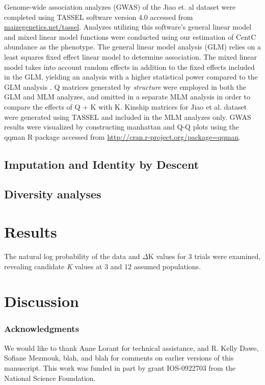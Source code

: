 \documentclass[12pt]{article}
\begin{document}

Genome-wide association analyzes (GWAS) of the Jiao et. al dataset \cite{Jiao2012} were completed using TASSEL \cite{Bradbury2007} software version 4.0 accessed from \url{maizegenetics.net/tassel}.  Analyzes utilizing this software's general linear model and mixed linear model functions were conducted using our estimation of CentC abundance as the phenotype.  The general linear model analysis (GLM) relies on a least squares fixed effect linear model to determine association.  The mixed linear model takes into account random effects in addition to the fixed effects included in the GLM, yielding an analysis with a higher statistical power compared to the GLM analysis \cite{Yu2006}.  Q matrices generated by \emph{structure} were employed in both the GLM and MLM analyzes, and omitted in a separate MLM analysis in order to compare the effects of Q + K with K.  Kinship matrices for Jiao et al. dataset \cite{Jiao2012} were generated using TASSEL and included in the MLM analyzes only.    
GWAS results were visualized by constructing manhattan and Q-Q plots using the qqman \cite{Turner2014} R package accessed from \url{http://cran.r-project.org/package=qqman}.   

\subsection{Imputation and Identity by Descent} %


\subsection{Diversity analyses} %


\section{Results}

The natural log probability of the data and  $\Delta$K values for 3 trials were examined, revealing candidate \emph{K} values at 3 and 12 assumed populations.    

\section{Discussion}

\subsubsection*{Acknowledgments}
We would like to thank Anne Lorant for technical assistance, and R. Kelly Dawe, Sofiane Mezmouk, blah, and blah for comments on earlier versions of this manuscript.  This work was funded in part by grant IOS-0922703 from the National Science Foundation.

\clearpage

\end{document}
